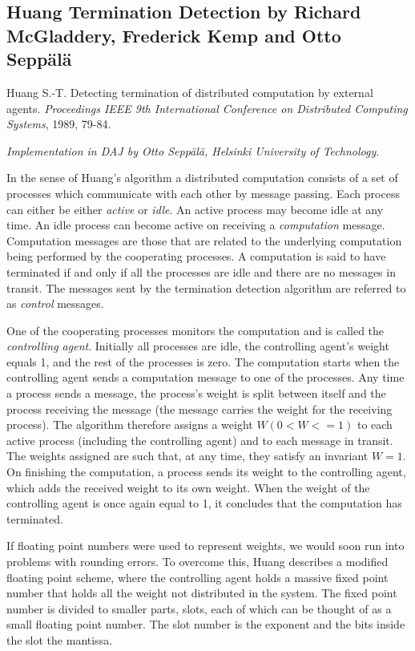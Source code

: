 \documentclass[11pt]{article}
\begin{document}
\subsection{Huang Termination Detection
by Richard McGladdery, Frederick Kemp and Otto Sepp\"al\"a}

Huang S.-T.
Detecting termination of distributed computation by external agents.
\emph{Proceedings IEEE 9th International Conference on
Distributed Computing Systems},
1989, 79-84.

\emph{Implementation in DAJ by Otto Sepp\"al\"a, Helsinki University of Technology}.

In the sense of Huang's algorithm a distributed computation consists of
a set of processes which communicate with each other by message passing.
Each process can either be either \emph{active} or \emph{idle}.
An active process may become idle at any time.
An idle process can become active on receiving a \emph{computation}
message. Computation messages are those that are related to the underlying
computation being performed by the cooperating processes. A computation
is said to have terminated if and only if all the processes are idle and
there are no messages in transit. The messages sent by the termination
detection algorithm are referred to as \emph{control} messages.

One of the cooperating processes monitors the computation
and is called the \emph{controlling agent}.
Initially all processes are
idle, the controlling agent's weight equals 1, and the rest of the processes
is zero. The computation starts when the controlling agent sends a computation
message to one of the processes. Any time a process sends a message, the
process's weight is split between itself and the process receiving the
message (the message carries the weight for the receiving process). The
algorithm therefore assigns a weight $W (0 < W <= 1)$ to each active
process (including the controlling agent) and to each message in transit.
The weights assigned are such that, at any time, they satisfy an invariant
$W = 1$. On finishing the computation,
a process sends its weight to the controlling agent, which adds the received
weight to its own weight. When the weight of the controlling agent is once
again equal to 1, it concludes that the computation has terminated.

If floating point numbers were used to represent weights, we would soon run
into problems with rounding errors. To overcome this, Huang describes a
modified floating point scheme, where the controlling agent holds a massive
fixed point number that holds all the weight not distributed in the system.
The fixed point number is divided to smaller parts, slots, each of which can be
thought of as a small floating point number. The slot number is the exponent
and the bits inside the slot the mantissa.
\end{document}
